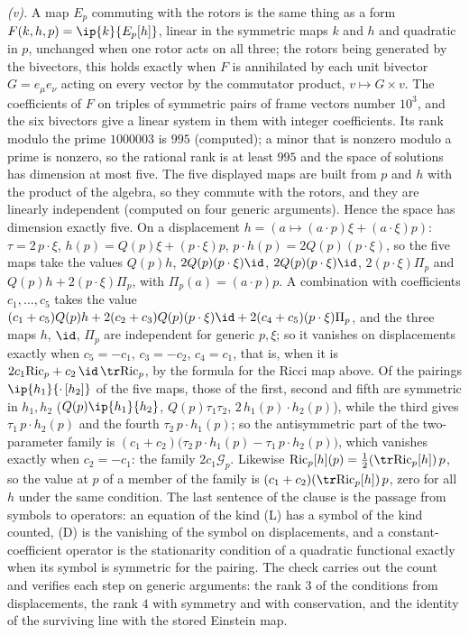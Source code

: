 \emph{(v).} A map $E_{p}$ commuting with the rotors is the same thing as a form $F(k, h, p) = \ip{k}{E_{p}[h]}$, linear in the symmetric maps $k$ and $h$ and quadratic in $p$, unchanged when one rotor acts on all three; the rotors being generated by the bivectors, this holds exactly when $F$ is annihilated by each unit bivector $G = e_{\mu}e_{\nu}$ acting on every vector by the commutator product, $v \mapsto G \times v$. The coefficients of $F$ on triples of symmetric pairs of frame vectors number $10^{3}$, and the six bivectors give a linear system in them with integer coefficients. Its rank modulo the prime $1000003$ is $995$ (computed); a minor that is nonzero modulo a prime is nonzero, so the rational rank is at least $995$ and the space of solutions has dimension at most five. The five displayed maps are built from $p$ and $h$ with the product of the algebra, so they commute with the rotors, and they are linearly independent (computed on four generic arguments). Hence the space has dimension exactly five. On a displacement $h = (a \mapsto (a \cdot p)\xi + (a \cdot \xi)p)$: $\tau = 2\,p \cdot \xi$, $h(p) = Q(p)\xi + (p \cdot \xi)p$, $p \cdot h(p) = 2Q(p)(p \cdot \xi)$, so the five maps take the values $Q(p)h$, $2Q(p)(p \cdot \xi)\id$, $2Q(p)(p \cdot \xi)\id$, $2(p \cdot \xi)\Pi_{p}$ and $Q(p)h + 2(p \cdot \xi)\Pi_{p}$, with $\Pi_{p}(a) = (a \cdot p)p$. A combination with coefficients $c_{1}, \dots, c_{5}$ takes the value $(c_{1} + c_{5})Q(p)h + 2(c_{2} + c_{3})Q(p)(p \cdot \xi)\id + 2(c_{4} + c_{5})(p \cdot \xi)\Pi_{p}$, and the three maps $h$, $\id$, $\Pi_{p}$ are independent for generic $p, \xi$; so it vanishes on displacements exactly when $c_{5} = -c_{1}$, $c_{3} = -c_{2}$, $c_{4} = c_{1}$, that is, when it is $2c_{1}\mathrm{Ric}_{p} + c_{2}\,\id\,\tr\mathrm{Ric}_{p}$, by the formula for the Ricci map above. Of the pairings $\ip{h_{1}}{\cdot\,[h_{2}]}$ of the five maps, those of the first, second and fifth are symmetric in $h_{1}, h_{2}$ ($Q(p)\ip{h_{1}}{h_{2}}$, $Q(p)\tau_{1}\tau_{2}$, $2\,h_{1}(p) \cdot h_{2}(p)$), while the third gives $\tau_{1}\,p \cdot h_{2}(p)$ and the fourth $\tau_{2}\,p \cdot h_{1}(p)$; so the antisymmetric part of the two-parameter family is $(c_{1} + c_{2})\bigl(\tau_{2}\,p \cdot h_{1}(p) - \tau_{1}\,p \cdot h_{2}(p)\bigr)$, which vanishes exactly when $c_{2} = -c_{1}$: the family $2c_{1}\mathcal{G}_{p}$. Likewise $\mathrm{Ric}_{p}[h](p) = \tfrac12(\tr\mathrm{Ric}_{p}[h])\,p$, so the value at $p$ of a member of the family is $(c_{1} + c_{2})(\tr\mathrm{Ric}_{p}[h])\,p$, zero for all $h$ under the same condition. The last sentence of the clause is the passage from symbols to operators: an equation of the kind (L) has a symbol of the kind counted, (D) is the vanishing of the symbol on displacements, and a constant-coefficient operator is the stationarity condition of a quadratic functional exactly when its symbol is symmetric for the pairing. The check carries out the count and verifies each step on generic arguments: the rank $3$ of the conditions from displacements, the rank $4$ with symmetry and with conservation, and the identity of the surviving line with the stored Einstein map.

